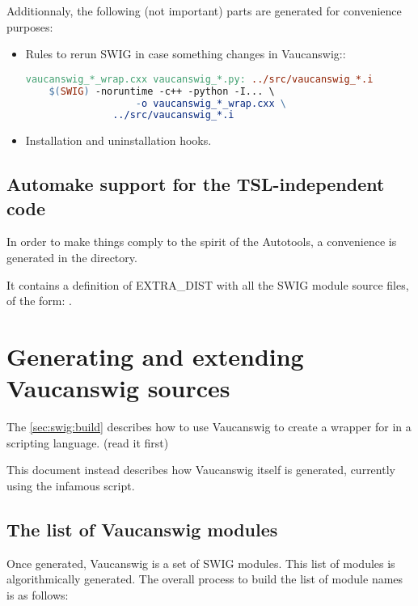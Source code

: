 Additionnaly, the following (not important) parts are generated for
convenience purposes:

\begin{itemize}
\item Rules to rerun SWIG in case something changes in Vaucanswig::
\begin{lstlisting}[language=Makefile]
vaucanswig_*_wrap.cxx vaucanswig_*.py: ../src/vaucanswig_*.i
	$(SWIG) -noruntime -c++ -python -I... \
	               -o vaucanswig_*_wrap.cxx \
		       ../src/vaucanswig_*.i
\end{lstlisting}%
                     
\item Installation and uninstallation hooks.
\end{itemize}


\subsection{Automake support for the TSL-independent code}

In order to make things comply to the spirit of the Autotools, a
convenience  is generated in the 
directory.

It contains a definition of EXTRA_DIST with all the SWIG module
source files, of the form: .


\section{Generating and extending Vaucanswig sources}

The \autoref{sec:swig:build} describes how to use Vaucanswig to create
a wrapper for \Vauc in a scripting language.  (read it first)

This document instead describes how Vaucanswig itself is generated,
currently using the infamous  script.

\subsection{The list of Vaucanswig modules}

Once generated, Vaucanswig is a set of SWIG modules. This list of
modules is algorithmically generated. The overall process to build the
list of module names is as follows:

